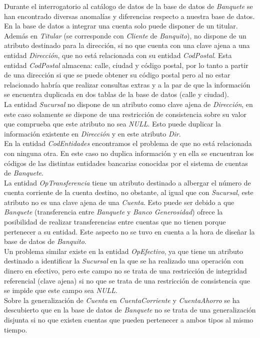 \documentclass{article}
\begin{document}
Durante el interrogatorio al catálogo de datos de la base de datos de \emph{Banquete} se han encontrado diversas anomalías y diferencias respecto a nuestra base de datos.\\
En la base de datos a integrar una cuenta solo puede disponer de un titular. Además en \emph{Titular} (se corresponde con \emph{Cliente} de \emph{Banquito}), no dispone de un atributo destinado para la dirección, si no que cuenta con una clave ajena a una entidad \emph{Dirección}, que no está relacionada con su entidad \emph{CodPostal}. Esta entidad \emph{CodPostal} almacena: calle, ciudad y código postal, por lo tanto a partir de una dirección si que se puede obtener su código postal pero al no estar relacionado habría que realizar consultas extras y a la par de que la información se encuentra duplicada en dos tablas de la base de datos (calle y ciudad).\\
La entidad \emph{Sucursal} no dispone de un atributo como clave ajena de \emph{Dirección}, en este caso solamente se dispone de una restricción de consistencia sobre su valor que comprueba que este atributo no sea \emph{NULL}. Esto puede duplicar la información existente en \emph{Dirección} y en este atributo \emph{Dir}.\\
En la entidad \emph{CodEntidades} encontramos el problema de que no está relacionada con ninguna otra. En este caso no duplica información y en ella se encuentran los códigos de las distintas entidades bancarias conocidas por el sistema de cuentas de \emph{Banquete}.\\
La entidad \emph{OpTransferencia} tiene un atributo destinado a albergar el número de cuenta corriente de la cuenta destino, no obstante, al igual que con \emph{Sucursal}, este atributo no es una clave ajena de una \emph{Cuenta}. Esto puede ser debido a que \emph{Banquete} (transferencia entre \emph{Banquete} y \emph{Banco Generosidad}) ofrece la posibilidad de realizar transferencias entre cuentas que no tienen porque pertenecer a su entidad. Este aspecto no se tuvo en cuenta a la hora de diseñar la base de datos de \emph{Banquito}.\\
Un problema similar existe en la entidad \emph{OpEfectivo}, ya que tiene un atributo destinado a identificar la \emph{Sucursal} en la que se ha realizado una operación con dinero en efectivo, pero este campo no se trata de una restricción de integridad referencial (clave ajena) si no que se trata de una restricción de consistencia que se impide que este campo sea \emph{NULL}.\\
Sobre la generalización de \emph{Cuenta} en \emph{CuentaCorriente} y \emph{CuentaAhorro} se ha descubierto que en la base de datos de \emph{Banquete} no se trata de una generalización disjunta si no que existen cuentas que pueden pertenecer a ambos tipos al mismo tiempo.\\
\end{document}
